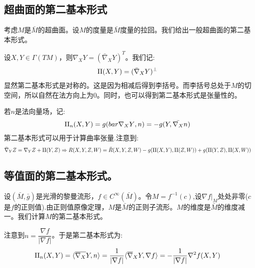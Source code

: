 \subsection*{超曲面的第二基本形式}

考虑$M$是$\bar{M}$的超曲面。设$M$的度量是$\bar{M}$度量的拉回。我们给出一般超曲面的第二基本形式。

设$X,Y \in \Gamma(TM)$，则$\nabla_X Y=(\bar{\nabla}_X Y)^T$。我们记:
\begin{align*}
    \mathrm{II}(X,Y)=(\bar{\nabla}_X Y)^{\bot}
\end{align*}
显然第二基本形式是对称的。这是因为相减后得到李括号。而李括号总处于$M$的切空间，所以自然在法方向上为$0$。同时，也可以得到第二基本形式是张量性的。

若$n$是法向量场，记:
\begin{align*}
    \mathrm{II}_n(X,Y)=g(bar{\nabla_X Y},n)=-g(Y,\bar{\nabla_X} n)
\end{align*}
第二基本形式可以用于计算曲率张量.注意到:
\begin{align*}
    \bar{\nabla}_Y Z=\nabla_Y Z+\mathrm{II}(Y,Z) \Rightarrow R(X,Y,Z,W)=\bar{R}(X,Y,Z,W)-g(\mathrm{II}(X,Y),\mathrm{II}(Z,W))+g(\mathrm{II}(Y,Z),\mathrm{II}(X,W))
\end{align*}
\subsection*{等值面的第二基本形式。}


设$(\bar{M},\bar{g})$是光滑的黎曼流形，$f \in C^\infty(\bar{M})$。令$M=f^{-1}(c)$,设$\nabla f|_M$处处非零($c$是$f$的正则值).由正则值原像定理，$M$是$\bar{M}$的正则子流形。$M$的维度是$\bar{M}$的维度减一。我们计算$M$的第二基本形式。

注意到$n=\dfrac{\nabla f}{|\nabla f|}$。于是第二基本形式为:
\begin{align*}
    \mathrm{II}_n(X,Y)=\langle \overline{\nabla_X}Y,n\rangle=\frac{1}{|\nabla f|}\langle \overline{\nabla}_X Y,\nabla f\rangle=-\frac{1}{|\nabla f|}\nabla^2 f(X,Y)
\end{align*}

